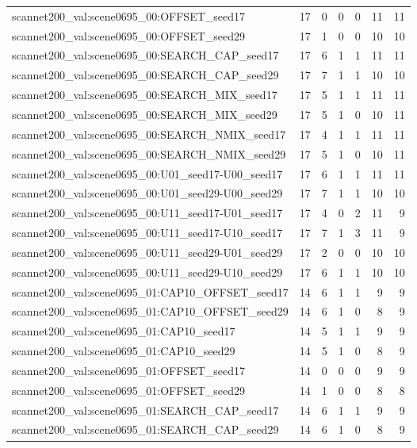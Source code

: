 \begin{table}[t]
\begin{tabular}{lrrrrrr}
scannet200\_val:scene0695\_00:OFFSET\_seed17 & 17 & 0 & 0 & 0 & 11 & 11 \\
scannet200\_val:scene0695\_00:OFFSET\_seed29 & 17 & 1 & 0 & 0 & 10 & 10 \\
scannet200\_val:scene0695\_00:SEARCH\_CAP\_seed17 & 17 & 6 & 1 & 1 & 11 & 11 \\
scannet200\_val:scene0695\_00:SEARCH\_CAP\_seed29 & 17 & 7 & 1 & 1 & 10 & 10 \\
scannet200\_val:scene0695\_00:SEARCH\_MIX\_seed17 & 17 & 5 & 1 & 1 & 11 & 11 \\
scannet200\_val:scene0695\_00:SEARCH\_MIX\_seed29 & 17 & 5 & 1 & 0 & 10 & 11 \\
scannet200\_val:scene0695\_00:SEARCH\_NMIX\_seed17 & 17 & 4 & 1 & 1 & 11 & 11 \\
scannet200\_val:scene0695\_00:SEARCH\_NMIX\_seed29 & 17 & 5 & 1 & 0 & 10 & 11 \\
scannet200\_val:scene0695\_00:U01\_seed17-U00\_seed17 & 17 & 6 & 1 & 1 & 11 & 11 \\
scannet200\_val:scene0695\_00:U01\_seed29-U00\_seed29 & 17 & 7 & 1 & 1 & 10 & 10 \\
scannet200\_val:scene0695\_00:U11\_seed17-U01\_seed17 & 17 & 4 & 0 & 2 & 11 & 9 \\
scannet200\_val:scene0695\_00:U11\_seed17-U10\_seed17 & 17 & 7 & 1 & 3 & 11 & 9 \\
scannet200\_val:scene0695\_00:U11\_seed29-U01\_seed29 & 17 & 2 & 0 & 0 & 10 & 10 \\
scannet200\_val:scene0695\_00:U11\_seed29-U10\_seed29 & 17 & 6 & 1 & 1 & 10 & 10 \\
scannet200\_val:scene0695\_01:CAP10\_OFFSET\_seed17 & 14 & 6 & 1 & 1 & 9 & 9 \\
scannet200\_val:scene0695\_01:CAP10\_OFFSET\_seed29 & 14 & 6 & 1 & 0 & 8 & 9 \\
scannet200\_val:scene0695\_01:CAP10\_seed17 & 14 & 5 & 1 & 1 & 9 & 9 \\
scannet200\_val:scene0695\_01:CAP10\_seed29 & 14 & 5 & 1 & 0 & 8 & 9 \\
scannet200\_val:scene0695\_01:OFFSET\_seed17 & 14 & 0 & 0 & 0 & 9 & 9 \\
scannet200\_val:scene0695\_01:OFFSET\_seed29 & 14 & 1 & 0 & 0 & 8 & 8 \\
scannet200\_val:scene0695\_01:SEARCH\_CAP\_seed17 & 14 & 6 & 1 & 1 & 9 & 9 \\
scannet200\_val:scene0695\_01:SEARCH\_CAP\_seed29 & 14 & 6 & 1 & 0 & 8 & 9 \\

\end{tabular}
\end{table}
